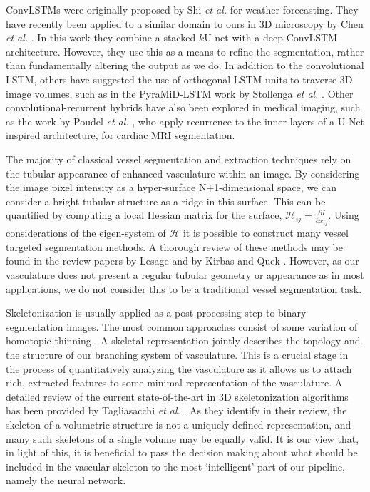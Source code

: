 \documentclass[journal,transmag]{IEEEtran}
\newcommand{\pder}[2][]{\frac{\partial#1}{\partial#2}}
\begin{document}
ConvLSTMs were originally proposed by Shi \textit{et al.} \cite{SHI2015} for weather forecasting. 
They have recently been applied to a similar domain to ours in 3D microscopy by Chen \emph{et al.} \cite{Chen2016}. In this work they combine a stacked $k$U-net with a deep ConvLSTM architecture. However, they use this as a means to refine the segmentation, rather than fundamentally altering the output as we do. In addition to the convolutional LSTM, others have suggested the use of orthogonal LSTM units to traverse 3D image volumes, such as in the PyraMiD-LSTM work by Stollenga \emph{et al.} \cite{Stollenga2015}. Other convolutional-recurrent hybrids have also been explored in medical imaging, such as the work by Poudel \textit{et al.} \cite{Poudel2016}, who apply recurrence to the inner layers of a U-Net inspired architecture, for cardiac MRI segmentation.

The majority of classical vessel segmentation and extraction techniques rely on the tubular appearance of enhanced vasculature within an image. By considering the image pixel intensity as a hyper-surface N+1-dimensional space, we can consider a bright tubular structure as a ridge in this surface. This can be quantified by computing a local Hessian matrix for the surface, $\mathcal{H}_{ij} = \pder[I]{x_{ij}}$. Using considerations of the eigen-system of $\mathcal{H}$ it is possible to construct many vessel targeted segmentation methods. A thorough review of these methods may be found in the review papers by Lesage \cite{Lesage2009} and by Kirbas and Quek \cite{Kirbas2003}. However, as our vasculature does not present a regular tubular geometry or appearance as in most applications, we do not consider this to be a traditional vessel segmentation task. 

Skeletonization is usually applied as a post-processing step to binary segmentation images. The most common approaches consist of some variation of homotopic thinning \cite{Pudney1998}. A skeletal representation jointly describes the topology and the structure of our branching system of vasculature. This is a crucial stage in the process of quantitatively analyzing the vasculature as it allows us to attach rich, extracted features to some minimal representation of the vasculature.  A detailed review of the current state-of-the-art in 3D skeletonization algorithms has been provided by Tagliasacchi \emph{et al.} \cite{Tagliasacchi2016}. As they identify in their review, the skeleton of a volumetric structure is not a uniquely defined representation, and many such skeletons of a single volume may be equally valid. It is our view that, in light of this, it is beneficial to pass the decision making about what should be included in the vascular skeleton to the most `intelligent' part of our pipeline, namely the neural network.
\end{document}

